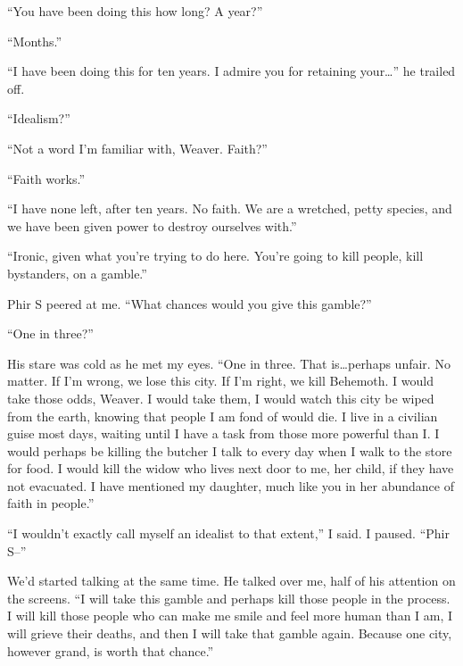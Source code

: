 ``You have been doing this how long?  A year?''



``Months.''



``I have been doing this for ten years.  I admire you for retaining your\ldots'' he trailed off.



``Idealism?''



``Not a word I'm familiar with, Weaver.  Faith?''



``Faith works.''



``I have none left, after ten years.  No faith.  We are a wretched, petty species, and we have been given power to destroy ourselves with.''



``Ironic, given what you're trying to do here.  You're going to kill people, kill bystanders, on a gamble.''



Phir S peered at me.  ``What chances would you give this gamble?''



``One in three?''



His stare was cold as he met my eyes.  ``One in three.  That is\ldots perhaps unfair.  No matter.  If I'm wrong, we lose this city.  If I'm right, we kill Behemoth.  I would take those odds, Weaver.  I would take them, I would watch this city be wiped from the earth, knowing that people I am fond of would die.  I live in a civilian guise most days, waiting until I have a task from those more powerful than I.  I would perhaps be killing the butcher I talk to every day when I walk to the store for food.  I would kill the widow who lives next door to me, her child, if they have not evacuated.  I have mentioned my daughter, much like you in her abundance of faith in people.''



``I wouldn't exactly call myself an idealist to that extent,'' I said.  I paused.  ``Phir S--''



We'd started talking at the same time.  He talked over me, half of his attention on the screens.  ``I will take this gamble and perhaps kill those people in the process.  I will kill those people who can make me smile and feel more human than I am, I will grieve their deaths, and then I will take that gamble again.  Because one city, however grand, is worth that chance.''



